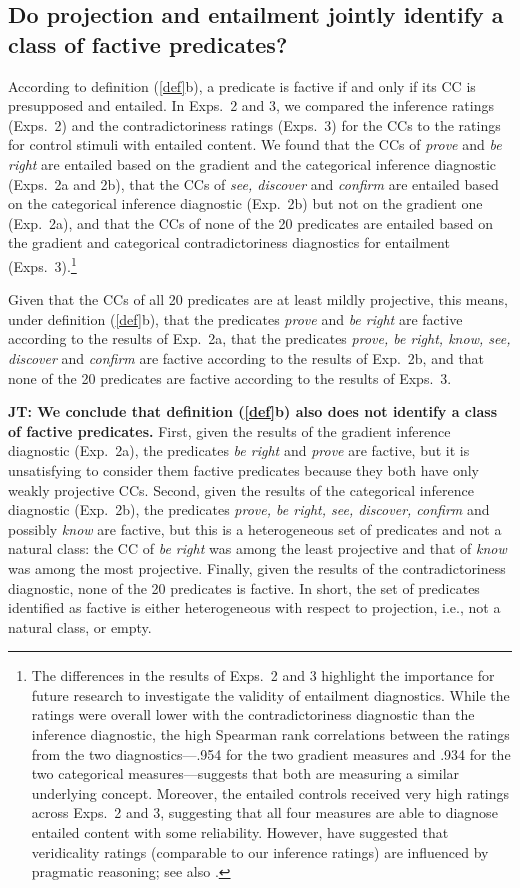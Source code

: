 \documentclass[11pt,fleqn]{article}
\newcommand{\6}{\mbox{$[\hspace*{-.6mm}[$}}
\newcommand{\9}{\mbox{$]\hspace*{-.6mm}]$}}
\newcommand{\jt}[1]{\textbf{\color{blue}JT: #1}}
\begin{document}
{\subsection{Do projection and entailment jointly identify a class of factive predicates?}\label{s33}

According to definition (\ref{def}b), a predicate is factive if and only if its CC is presupposed and entailed. In Exps.~2 and 3, we compared the inference ratings (Exps.~2) and the contradictoriness ratings (Exps.~3) for the CCs to the ratings for control stimuli with entailed content. We found that the CCs of {\em prove} and {\em be right} are entailed based on the gradient and the categorical inference diagnostic (Exps.~2a and 2b), that the CCs of {\em see, discover} and {\em confirm} are entailed based on the categorical inference diagnostic (Exp.~2b) but not on the gradient one (Exp.~2a), and that the CCs of none of the 20 predicates are entailed based on the gradient and categorical contradictoriness diagnostics for entailment (Exps.~3).\footnote{The differences in the results of Exps.~2 and 3 highlight the importance for future research to investigate the validity of entailment diagnostics. While the ratings were overall lower with the  contradictoriness diagnostic than the inference diagnostic, the high Spearman rank correlations between the ratings from the two diagnostics---.954 for the two gradient measures and .934 for the two categorical measures---suggests that both are measuring a similar underlying concept. Moreover, the entailed controls received very high ratings across Exps.~2 and 3, suggesting that all four measures are able to diagnose entailed content with some reliability.   However, \citet[329]{demarneffe-etal2012} have suggested that veridicality ratings (comparable to our inference ratings) are influenced by pragmatic reasoning; see also \citealt{pavlick-kwiatkowski2019}.}} Given that the CCs of all 20 predicates are at least mildly projective, this means, under definition (\ref{def}b), that the predicates {\em prove} and {\em be right} are factive according to the results of Exp.~2a, that the predicates {\em prove, be right, know, see, discover} and {\em confirm} are factive according to the results of Exp.~2b, and that none of the 20 predicates are factive according to the results of Exps.~3.  

\jt{We conclude that definition (\ref{def}b) also does not identify a class of factive predicates.} First, given the results of the gradient inference diagnostic (Exp.~2a), the predicates {\em be right} and {\em prove} are factive, but it is unsatisfying to consider them factive predicates because they both have only weakly projective CCs. Second, given the results of the categorical inference diagnostic (Exp.~2b), the predicates {\em prove, be right, see, discover, confirm} and possibly {\em know} are factive, but this is a heterogeneous set of predicates and not a natural class: the CC of {\em be right} was among the least projective and that of {\em know} was among the most projective. Finally, given the results of the contradictoriness diagnostic, none of the 20 predicates is factive. In short, the set of predicates identified as factive is either heterogeneous with respect to projection, i.e., not a natural class, or empty. 
\end{document}
